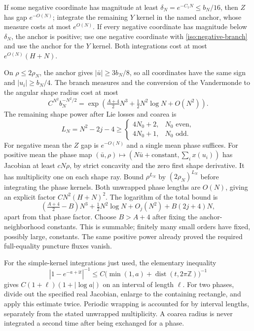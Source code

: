 \documentclass[11pt]{article}
\numberwithin{equation}{section}
\theoremstyle{definition}
\newcommand{\Z}{\mathbb Z}
\newcommand{\ii}{\mathrm i}
\DeclareMathOperator{\dist}{dist}
\begin{document}
If some negative coordinate has magnitude at least
$\delta_N=e^{-C_1N}\le b_N/16$, then $Z$ has gap $e^{-O(N)}$;
integrate the remaining $Y$ kernel in the named anchor, whose measure
costs at most $e^{O(N)}$. If every negative coordinate has magnitude
below $\delta_N$, the anchor is positive; use one negative coordinate
with \eqref{iso:negative-branch} and use the anchor for the $Y$ kernel.
Both integrations cost at most $e^{O(N)}(H+N)$.

On $\rho\le2\rho_N$, the anchor gives
$|\bar u|\ge3b_N/8$, so all coordinates have the same sign and
$|u_i|\ge b_N/4$. The branch measures and the conversion of the
Vandermonde to the angular shape radius cost at most
\[
 C^{N^2}b_N^{-N^2/2}
 =\exp\left(\tfrac{A+4}{2}N^3+\tfrac12N^2\log N+O(N^2)\right).
\]
The remaining shape power after Lie losses and coarea is
\[
 L_N=N^2-2j-4\ge
 \begin{cases}4N_0+2,&N_0\text{ even},\\4N_0+1,&N_0\text{ odd}.
 \end{cases}
\]
For negative mean the $Z$ gap is $e^{-O(N)}$ and a single mean phase
suffices. For positive mean the phase map
$(\bar u,\rho)\mapsto(N\bar u+\text{constant},\sum_i x(u_i))$
has Jacobian at least $cN\rho$, by strict concavity and the zero first
shape derivative. It has multiplicity one on each shape ray.
Bound $\rho^{L_N}$ by $(2\rho_N)^{L_N}$ before integrating the
phase kernels. Both unwrapped phase lengths are $O(N)$, giving an
explicit factor $CN^2(H+N)^2$. The logarithm of the total bound is
\[
 \left(\tfrac{A+4}{2}-B\right)N^3+\tfrac12N^2\log N
 +O_j(N^2)+B(2j+4)N,
\]
apart from that phase factor. Choose $B>A+4$ after fixing the
anchor-neighborhood constants. This is summable; finitely many small
orders have fixed, possibly large, constants. The same positive power
already proved the required full-equality puncture fluxes vanish.

For the simple-kernel integrations just used, the elementary inequality
\[
 |1-e^{-a+\ii t}|^{-1}
 \le C\bigl(\min(1,a)+\dist(t,2\pi\Z)\bigr)^{-1}
\]
gives $C(1+\ell)(1+|\log a|)$ on an interval of length $\ell$.
For two phases, divide out the specified real Jacobian, enlarge to the
containing rectangle, and apply this estimate twice. Periodic wrapping
is accounted for by interval lengths, separately from the stated
unwrapped multiplicity. A coarea radius is never integrated a second
time after being exchanged for a phase.
\end{document}
